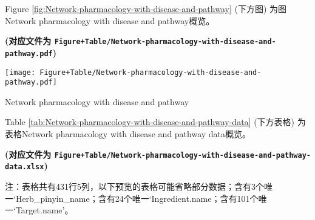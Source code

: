 \documentclass[
]{article}
\begin{document}
\begin{center}\vspace{1.5cm}\end{center}

Figure \ref{fig:Network-pharmacology-with-disease-and-pathway} (下方图) 为图Network pharmacology with disease and pathway概览。

\textbf{(对应文件为 \texttt{Figure+Table/Network-pharmacology-with-disease-and-pathway.pdf})}

\def\@captype{figure}
\begin{center}
\texttt{[image: Figure+Table/Network-pharmacology-with-disease-and-pathway.pdf]}
\caption{Network pharmacology with disease and pathway}\label{fig:Network-pharmacology-with-disease-and-pathway}
\end{center}

\begin{center}\vspace{1.5cm}\end{center}

\begin{center}\vspace{1.5cm}\end{center}

Table \ref{tab:Network-pharmacology-with-disease-and-pathway-data} (下方表格) 为表格Network pharmacology with disease and pathway data概览。

\textbf{(对应文件为 \texttt{Figure+Table/Network-pharmacology-with-disease-and-pathway-data.xlsx})}

\begin{center}\begin{tcolorbox}[colback=gray!10, colframe=gray!50, width=0.9\linewidth, arc=1mm, boxrule=0.5pt]注：表格共有431行5列，以下预览的表格可能省略部分数据；含有3个唯一`Herb\_pinyin\_name；含有24个唯一`Ingredient.name；含有101个唯一`Target.name'。
\end{tcolorbox}
\end{center}
\end{document}
